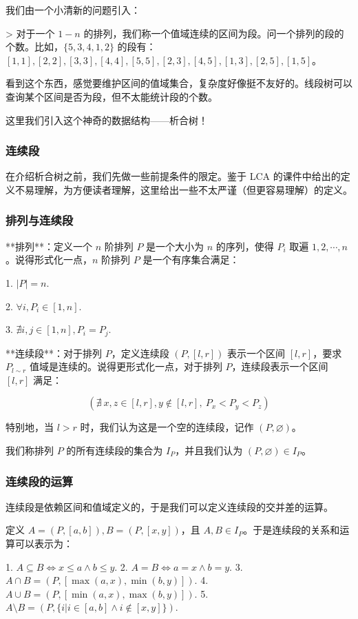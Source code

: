 \documentclass{ctexart}
\begin{document}
我们由一个小清新的问题引入：

> 对于一个 $1-n$ 的排列，我们称一个值域连续的区间为段。问一个排列的段的个数。比如，$\{5 ,3 ,4, 1 ,2\}$ 的段有：$[1,1],[2,2],[3,3],[4,4],[5,5],[2,3],[4,5],[1,3],[2,5],[1,5]$。

看到这个东西，感觉要维护区间的值域集合，复杂度好像挺不友好的。线段树可以查询某个区间是否为段，但不太能统计段的个数。

这里我们引入这个神奇的数据结构——析合树！

\subsubsection{连续段}

在介绍析合树之前，我们先做一些前提条件的限定。鉴于 LCA 的课件中给出的定义不易理解，为方便读者理解，这里给出一些不太严谨（但更容易理解）的定义。

\subsubsection{排列与连续段}

**排列**：定义一个 $n$ 阶排列 $P$ 是一个大小为 $n$ 的序列，使得 $P_i$ 取遍 $1,2,\cdots,n$。说得形式化一点，$n$ 阶排列 $P$ 是一个有序集合满足：

1. $|P|=n$.

2. $\forall i,P_i\in[1,n]$.

3. $\nexists i,j\in[1,n],P_i=P_j$.

   **连续段**：对于排列 $P$，定义连续段 $(P,[l,r])$ 表示一个区间 $[l,r]$，要求 $P_{l\sim r}$ 值域是连续的。说得更形式化一点，对于排列 $P$，连续段表示一个区间 $[l,r]$ 满足：

$$
(\nexists\ x,z\in[l,r],y\notin[l,r],\ P_x<P_y<P_z)
$$

特别地，当 $l>r$ 时，我们认为这是一个空的连续段，记作 $(P,\varnothing)$。

我们称排列 $P$ 的所有连续段的集合为 $I_P$，并且我们认为 $(P,\varnothing)\in I_P$。

\subsubsection{连续段的运算}

连续段是依赖区间和值域定义的，于是我们可以定义连续段的交并差的运算。

定义 $A=(P,[a,b]),B=(P,[x,y])$，且 $A,B\in I_P$。于是连续段的关系和运算可以表示为：

1. $A\subseteq B\iff x\le a\wedge b\le y$.
2. $A=B\iff a=x\wedge b=y$.
3. $A\cap B=(P,[\max(a,x),\min(b,y)])$.
4. $A\cup B=(P,[\min(a,x),\max(b,y)])$.
5. $A\setminus B=(P,\{i|i\in[a,b]\wedge i\notin[x,y]\})$.
\end{document}
